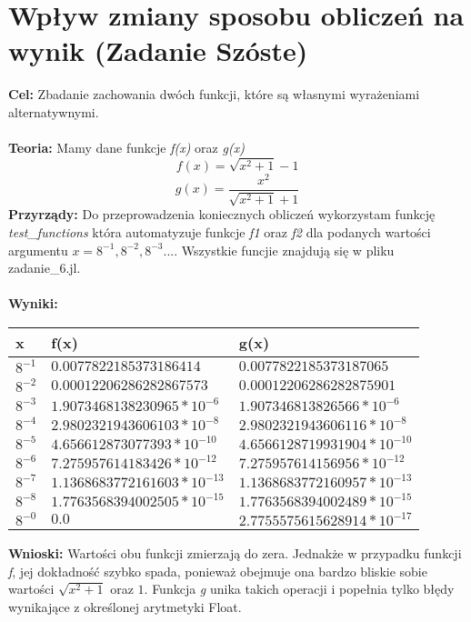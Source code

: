 \documentclass{article}
\begin{document}
\section{Wpływ zmiany sposobu obliczeń na wynik (Zadanie Szóste)}
\noindent \textbf{Cel:} Zbadanie zachowania dwóch funkcji, które są własnymi wyrażeniami alternatywnymi.\\\\
\noindent \textbf{Teoria:} Mamy dane funkcje \textit{f(x)} oraz \textit{g(x)}
$$f(x) = \sqrt{x^2 +1} -1$$
$$g(x) = \frac{x^2}{\sqrt{x^2 +1} +1}$$
\noindent \textbf{Przyrządy:} Do przeprowadzenia koniecznych obliczeń wykorzystam funkcję \textit{test\_functions} która automatyzuje funkcje \textit{f1} oraz \textit{f2} dla podanych wartości argumentu $x = 8^{-1},8^{-2},8^{-3}...$. Wszystkie funcjie znajdują się w pliku zadanie\_6.jl.\\\\
\noindent \textbf{Wyniki:}
\begin{center}
  \begin{tabular}{|p{}|p{5cm}|p{5cm}|} \hline
    \textbf{x} & \textbf{f(x)} & \textbf{g(x)} \\
    \hline
    $8^{-1}$ & $0.0077822185373186414$ & $0.0077822185373187065$ \\
    \hline
    $8^{-2}$ & $0.00012206286282867573$ & $0.00012206286282875901$ \\
    \hline
    $8^{-3}$ & $1.9073468138230965*10^{-6}$ & $1.907346813826566*10^{-6}$ \\
    \hline
    $8^{-4}$ & $2.9802321943606103*10^{-8}$ & $2.9802321943606116*10^{-8}$ \\
    \hline
    $8^{-5}$ & $4.656612873077393*10^{-10}$ & $4.6566128719931904*10^{-10}$ \\
    \hline
    $8^{-6}$ & $7.275957614183426*10^{-12}$ & $7.275957614156956*10^{-12}$ \\
    \hline
    $8^{-7}$ & $1.1368683772161603*10^{-13}$ & $1.1368683772160957*10^{-13}$ \\
    \hline
    $8^{-8}$ & $1.7763568394002505*10^{-15}$ & $1.7763568394002489*10^{-15}$ \\
    \hline
    $8^{-0}$ & $0.0$ & $2.7755575615628914*10^{-17}$ \\
    \hline
  \end{tabular}
\end{center}
\noindent \textbf{Wnioski:} Wartości obu funkcji zmierzają do zera. Jednakże w przypadku funkcji \textit{f}, jej dokładność szybko spada, ponieważ obejmuje ona bardzo bliskie sobie wartości $ \sqrt{x^2 +1}$ oraz $1$. Funkcja \textit{g} unika takich operacji i popełnia tylko błędy wynikające z określonej arytmetyki Float.\\\\
\end{document}

